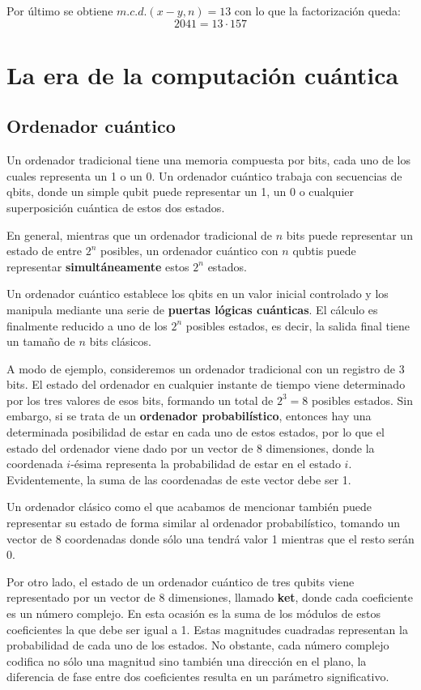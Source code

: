 \documentclass[nochap]{apuntesURJC}
\begin{document}
Por último se obtiene $m.c.d.(x-y,n)=13$ con lo que la factorización queda:
\[2041 = 13 \cdot 157\]


\section{La era de la computación cuántica}
\subsection{Ordenador cuántico}
Un ordenador tradicional tiene una memoria compuesta por bits, cada uno de los cuales representa un 1 o un 0. Un ordenador cuántico trabaja con secuencias de qbits, donde un simple qubit puede representar un 1, un 0 o cualquier superposición cuántica de estos dos estados.

En general, mientras que un ordenador tradicional de $n$ bits puede representar un estado de entre $2^n$ posibles, un ordenador cuántico con $n$ qubtis puede representar \textbf{simultáneamente} estos $2^n$ estados.

Un ordenador cuántico establece los qbits en un valor inicial controlado y los manipula mediante una serie de \textbf{puertas lógicas cuánticas}. El cálculo es finalmente reducido a uno de los $2^n$ posibles estados, es decir, la salida final tiene un tamaño de $n$ bits clásicos.

A modo de ejemplo, consideremos un ordenador tradicional con un registro de 3 bits. El estado del ordenador en cualquier instante de tiempo viene determinado por los tres valores de esos bits, formando un total de $2^3=8$ posibles estados. Sin embargo, si se trata de un \textbf{ordenador probabilístico}, entonces hay una determinada posibilidad de estar en cada uno de estos estados, por lo que el estado del ordenador viene dado por un vector de 8 dimensiones, donde la coordenada $i$-ésima representa la probabilidad de estar en el estado $i$. Evidentemente, la suma de las coordenadas de este vector debe ser 1.

Un ordenador clásico como el que acabamos de mencionar también puede representar su estado de forma similar al ordenador probabilístico, tomando un vector de 8 coordenadas donde sólo una tendrá valor 1 mientras que el resto serán 0.

Por otro lado, el estado de un ordenador cuántico de tres qubits viene representado por un vector de 8 dimensiones, llamado \textbf{ket}, donde cada coeficiente es un número complejo. En esta ocasión es la suma de los módulos de estos coeficientes la que debe ser igual a 1. Estas magnitudes cuadradas representan la probabilidad de cada uno de los estados. No obstante, cada número complejo codifica no sólo una magnitud sino también una dirección en el plano, la diferencia de fase entre dos coeficientes resulta en un parámetro significativo.
\end{document}
